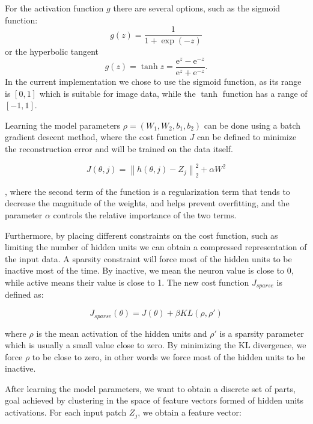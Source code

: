\documentclass[runningheads]{llncs}
\begin{document}
For the activation function $g$ there are several options, such as the sigmoid function:
\begin{equation}
  g(z)=\frac{1}{1+\exp(-z)}
\end{equation}
or the hyperbolic tangent
\begin{equation}
  g(z)=\tanh z=\frac{\text{e}^z-\text{e}^{-z}}{\text{e}^z+\text{e}^{-z}}.
\end{equation}
In the current implementation we chose to use the sigmoid function, as its range is $[0,1]$ which is suitable for image data, while the $\tanh$ function has a range of $[-1,1]$.

Learning the model parameters $\rho=(W_1,W_2,b_1,b_2)$ can be done using a batch gradient descent method, where the cost function $J$ can be defined to minimize the reconstruction error and will be trained on the data itself.

\begin{equation}
   J(\theta,j)=\left\|h(\theta,j)-Z_j\right\|_2^2 + \alpha W^2
\end{equation}

, where the second term of the function is a regularization term that tends to decrease the magnitude of the weights, and helps prevent overfitting, and the parameter $\alpha$ controls the relative importance of the two terms.
 
Furthermore, by placing different constraints on the cost function, such as limiting the number of hidden units we can obtain a compressed representation of the input data. A sparsity constraint will force most of the hidden units to be inactive most of the time. By inactive, we mean the neuron value is close to 0, while active means their value is close to 1. The new cost function $J_{sparse}$ is defined as:

\begin{equation}
J_{sparse}(\theta)=J(\theta)+\beta KL(\rho,\rho \prime)
\end{equation}

where $\rho$ is the mean activation of the hidden units and $\rho \prime$ is a sparsity parameter which is usually a small value close to zero. By minimizing the KL divergence, we force $\rho$ to be close to zero, in other words we force most of the hidden units to be inactive.

After learning the model parameters, we want to obtain a discrete set of parts, goal achieved by clustering in the space of feature vectors formed of hidden units activations. For each input patch $Z_j$, we obtain a feature vector:
\end{document}
